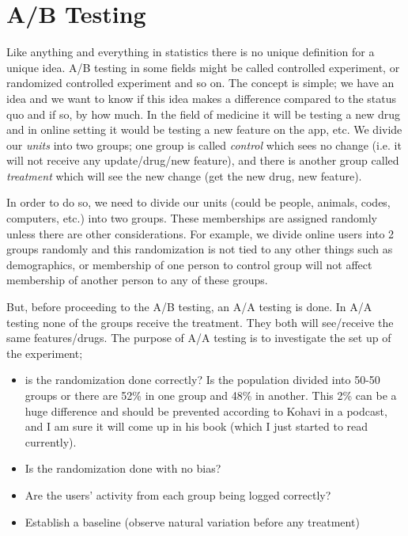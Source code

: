 \section{A/B Testing}
\label{sec:ABTesting}

Like anything and everything in statistics there is no unique definition
for a unique idea. A/B testing in some fields might be called controlled experiment,
or randomized controlled experiment and so on.
The concept is simple; we have an idea and we want to know
if this idea makes a difference compared to the status quo
and if so, by how much. 
In the field of medicine it will be testing a new 
drug and in online setting it would be testing a new feature on the 
app, etc. We divide our \emph{units} into two groups; one group
is called \emph{control} which sees no change (i.e. it will not receive any update/drug/new feature),
and there is another group called \emph{treatment} which will see the new change (get the new drug,
new feature).


In order to do so, we need to divide our units (could be people, animals, codes, computers, etc.)
into two groups. 
These memberships are assigned randomly unless there are other considerations.
For example, we divide online users into 2 groups randomly
and this randomization is not tied to any other things such as demographics,
or membership of one person to control group will not affect membership of another
person to any of these groups.

But, before proceeding to the A/B testing, an A/A testing is done.
In A/A testing none of the groups receive the treatment. They both will
see/receive the same features/drugs.
The purpose of A/A testing is to investigate the set up of the experiment;
\begin{itemize}
\setlength\itemsep{0pt}

\item is the randomization done correctly? Is the population divided into 50-50 groups
or there are 52\% in one group and 48\% in another. This 2\% can be a huge difference
and should be prevented according to Kohavi in a podcast, and I am sure it will come up
in his book\cite{kohavi2020trustworthy} (which I just started to read currently).

\item Is the randomization done with no bias?

\item Are the users' activity from each group being logged correctly?

\item Establish a baseline (observe natural variation before any treatment)

\end{itemize}


